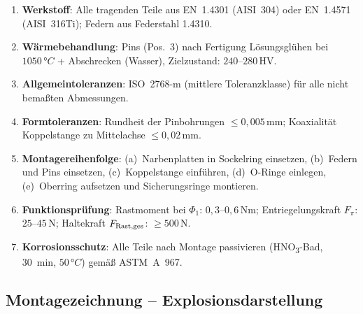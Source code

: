 ﻿\documentclass[12pt, a4paper]{article}
\theoremstyle{remark}
\begin{document}
\begin{enumerate}[noitemsep]
  \item \textbf{Werkstoff}: Alle tragenden Teile aus EN~1.4301 (AISI~304) oder EN~1.4571
        (AISI~316Ti); Federn aus Federstahl 1.4310.
  \item \textbf{Wärmebehandlung}: Pins (Pos.~3) nach Fertigung Lösungsglühen bei $1050\, °C$
        + Abschrecken (Wasser), Zielzustand: $240$--$280\,\text{HV}$.
  \item \textbf{Allgemeintoleranzen}: ISO~2768-m (mittlere Toleranzklasse) für alle
        nicht bemaßten Abmessungen.
  \item \textbf{Formtoleranzen}: Rundheit der Pinbohrungen $\leq 0{,}005\,\text{mm}$;
        Koaxialität Koppelstange zu Mittelachse $\leq 0{,}02\,\text{mm}$.
  \item \textbf{Montagereihenfolge}: (a)~Narbenplatten in Sockelring einsetzen,
        (b)~Federn und Pins einsetzen, (c)~Koppelstange einführen,
        (d)~O-Ringe einlegen, (e)~Oberring aufsetzen und Sicherungsringe montieren.
  \item \textbf{Funktionsprüfung}: Rastmoment bei $\Phi_1$: $0{,}3$--$0{,}6\,\text{Nm}$;
        Entriegelungskraft $F_\pi$: $25$--$45\,\text{N}$; Haltekraft $F_{\rm Rast,ges}$: $\geq 500\,\text{N}$.
  \item \textbf{Korrosionsschutz}: Alle Teile nach Montage passivieren (HNO\textsubscript{3}-Bad,
        30~min, $50\, °C$) gemäß ASTM~A~967.
\end{enumerate}

\subsection{Montagezeichnung -- Explosionsdarstellung}
\end{document}
